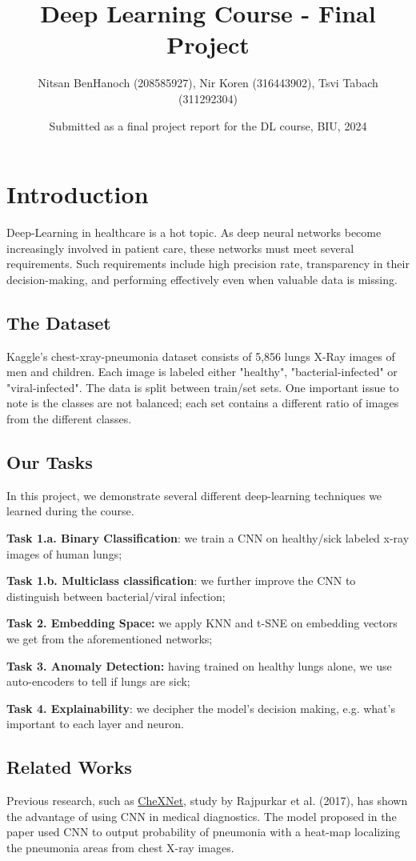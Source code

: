 \documentclass{article}
\title{Deep Learning Course - Final Project}
\author{Nitsan BenHanoch (208585927), Nir Koren (316443902), Tsvi Tabach (311292304)}
\date{Submitted as a final project report for the DL course, BIU, 2024}
\begin{document}
\maketitle

\section{Introduction}

Deep-Learning in healthcare is a hot topic. As deep neural networks become increasingly involved in patient care, these networks must meet several requirements. Such requirements include high precision rate, transparency in their decision-making, and performing effectively even when valuable data is missing.

\subsection{The Dataset}
Kaggle's chest-xray-pneumonia dataset consists of 5,856 lungs X-Ray images of men and children. Each image is labeled either "healthy", "bacterial-infected" or "viral-infected". The data is split between train/set sets. One important issue to note is the classes are not balanced; each set contains a different ratio of images from the different classes.

\subsection{Our Tasks}
In this project, we demonstrate several different deep-learning techniques we learned during the course.

\textbf{Task 1.a. Binary Classification}: we train a CNN on healthy/sick labeled x-ray images of human lungs;

\textbf{Task 1.b. Multiclass classification}: we further improve the CNN to distinguish between bacterial/viral infection;

\textbf{Task 2. Embedding Space:} we apply KNN and t-SNE on embedding vectors we get from the aforementioned networks;

\textbf{Task 3. Anomaly Detection:} having trained on healthy lungs alone, we use auto-encoders to tell if lungs are sick;

\textbf{Task 4. Explainability}: we decipher the model's decision making, e.g. what's important to each layer and neuron.


\subsection{Related Works}
Previous research, such as \href{https://arxiv.org/pdf/1711.05225.pdf}{CheXNet}, study by Rajpurkar et al. (2017), has shown the advantage of using CNN in medical diagnostics. The model proposed in the paper used CNN to output probability of pneumonia with a heat-map localizing the pneumonia areas from chest X-ray images.
\end{document}
